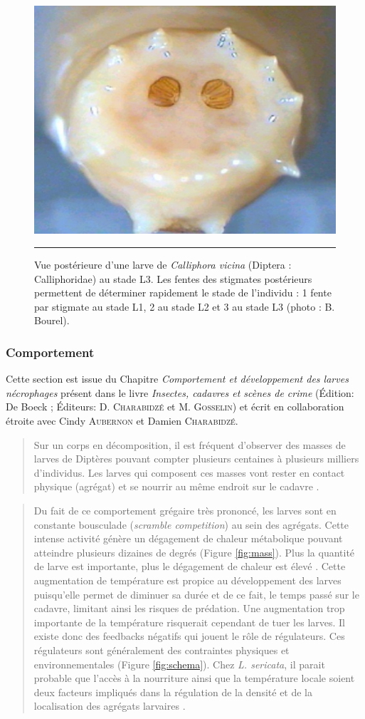 \begin{figure}[ht]
\centering
		\includegraphics[width=0.7 \textwidth]{Figures/stigmates.png}
		\rule{35em}{0.5pt}
		\caption[Stigmates]{Vue postérieure d’une larve de \textit{Calliphora vicina}
(Diptera : Calliphoridae) au stade L3. Les fentes des stigmates postérieurs permettent de déterminer rapidement le stade de l’individu : 1 fente par stigmate au stade L1, 2 au stade L2 et 3 au stade L3 (photo : B. Bourel).}
	\label{fig:stigmates}
\end{figure}
\clearpage

    \subsubsection{Comportement}
Cette section est issue du Chapitre \textit{Comportement et développement des larves nécrophages} présent dans le livre \textit{Insectes, cadavres et scènes de crime} (Édition: De Boeck ; Éditeurs: D. \textsc{Charabidzé} et M. \textsc{Gosselin}) et écrit en collaboration étroite avec Cindy \textsc{Aubernon} et Damien \textsc{Charabidzé}.


\blockquote{Sur un corps en décomposition, il est fréquent d’observer des masses de larves de Diptères pouvant compter plusieurs centaines à plusieurs milliers d’individus. Les larves qui composent ces masses vont rester en contact physique (agrégat) et se nourrir au même endroit sur le cadavre \cite{rivers_physiological_2011}.}

\blockquote{Du fait de ce comportement grégaire très prononcé, les larves sont en constante bousculade (\textit{scramble competition}) au sein des agrégats. Cette intense activité génère un dégagement de chaleur métabolique pouvant atteindre plusieurs dizaines de degrés (Figure \ref{fig:mass}). Plus la quantité de larve est importante, plus le dégagement de chaleur est élevé \cite{charabidze_larval-mass_2011}. Cette augmentation de température est propice au développement des larves puisqu’elle permet de diminuer sa durée et de ce fait, le temps passé sur le cadavre, limitant ainsi les risques de prédation. Une augmentation trop importante de la température risquerait cependant de tuer les larves. Il existe donc des feedbacks négatifs qui jouent le rôle de régulateurs. Ces régulateurs sont généralement des contraintes physiques et environnementales (Figure \ref{fig:schema}). Chez \textit{L. sericata}, il parait probable que l’accès à la nourriture ainsi que la température locale soient deux facteurs impliqués dans la régulation de la densité et de la localisation des agrégats larvaires \cite{charabidze_larval-mass_2011}.}

